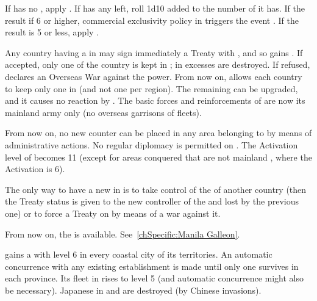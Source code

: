 
\condition{}
\aparag If \paysChine has no \TP, apply .
\aparag If \paysChine has any \TP left, roll 1d10 added to the number of \TP
it has. If the result if 6 or higher, commercial exclusivity policy in
\paysChine triggers the event . If the result
is 5 or less, apply .



\phevnt
\aparag Any country having a \TP in \paysChine may sign immediately a Treaty
with \paysChine, and so gains \dipAT. If accepted, only one \TP of the country
is kept in \paysChine; \TP in excesses are destroyed. If refused, \paysChine
declares an Overseas War against the power.
\aparag From now on, \dipAT allows each country to keep only one \TP in
\paysChine (and not one per region). The remaining \TP can be upgraded, and it
causes no reaction by \paysChine.
\aparag The basic forces and reinforcements of \paysChine are now its mainland
army only (no overseas garrisons of fleets).

\effetlong
\aparag From now on, no new \TP counter can be placed in any area belonging to
\paysChine by means of administrative actions.
\aparag No regular diplomacy is permitted on \paysChine.  The Activation level
of \paysChine becomes 11 (except for areas conquered that are not mainland
\paysChine, where the Activation is 6).

\aparag The only way to have a new \TP in \paysChine is to take control of the
\TP of another country (then the Treaty status is given to the new controller
of the \TP and lost by the previous one) or to force a Treaty on \paysChine by
means of a war against it.

\aparag From now on, the  is
available. See~\ref{chSpecific:Manila Galleon}.



\phevnt
\aparag \paysChine gains a \TP with level 6 in every coastal city of its
territories.  An automatic concurrence with any existing establishment is made
until only one \TP survives in each province. Its fleet in  rises
to level 5 (and automatic concurrence might also be necessary).
\aparag Japanese \TP in \granderegionCorea and \granderegionFormose are
destroyed (by Chinese invasions).

